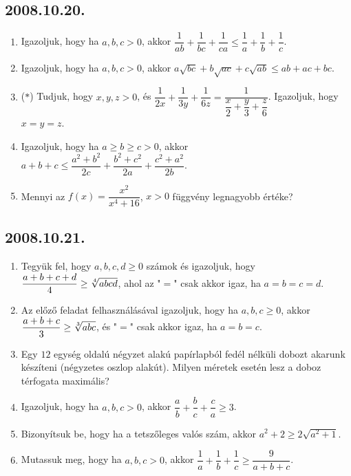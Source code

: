 \subsection*{2008.10.20.}
\begin{enumerate}
\item Igazoljuk, hogy ha $a,b,c>0$, akkor $\dfrac{1}{ab}+\dfrac{1}{bc}+\dfrac{1}{ca}\leq \dfrac{1}{a}+\dfrac{1}{b}+\dfrac{1}{c}$.
\item Igazoljuk, hogy ha $a,b,c>0$, akkor $a\sqrt{bc}+b\sqrt{ac}+c\sqrt{ab}\leq ab+ac+bc$.
\item ($*$) Tudjuk, hogy $x,y,z>0$, és $\dfrac{1}{2x}+\dfrac{1}{3y}+\dfrac{1}{6z}=\dfrac{1}{\dfrac{x}{2}+\dfrac{y}{3}+\dfrac{z}{6}}$. Igazoljuk, hogy $x=y=z$.
\item Igazoljuk, hogy ha $a\geq b\geq c>0$, akkor $a+b+c\leq \dfrac{a^2+b^2}{2c}+\dfrac{b^2+c^2}{2a}+\dfrac{c^2+a^2}{2b}$.
\item Mennyi az $f(x)=\dfrac{x^2}{x^4+16}$, $x>0$ függvény legnagyobb értéke?
\end{enumerate}
\subsection*{2008.10.21.}
\begin{enumerate}
\item Tegyük fel, hogy $a,b,c,d\geq 0$ számok és igazoljuk, hogy $\dfrac{a+b+c+d}{4}\geq \root4\of{abcd}$, ahol az "$=$" csak akkor igaz, ha $a=b=c=d$.
\item Az előző feladat felhasználásával igazoljuk, hogy ha $a,b,c\geq 0$, akkor $\dfrac{a+b+c}{3}\geq \root3\of{abc}$, és "$=$" csak akkor igaz, ha $a=b=c$.
\item Egy $12$ egység oldalú négyzet alakú papírlapból fedél nélküli dobozt akarunk készíteni (négyzetes oszlop alakút). Milyen méretek esetén lesz a doboz térfogata maximális?
\item Igazoljuk, hogy ha $a,b,c>0$, akkor $\dfrac{a}{b}+\dfrac{b}{c}+\dfrac{c}{a}\geq 3$.
\item Bizonyítsuk be, hogy ha a tetszőleges valós szám, akkor $a^2+2\geq 2\sqrt{a^2+1}$.
\item Mutassuk meg, hogy ha $a,b,c>0$, akkor $\dfrac{1}{a}+\dfrac{1}{b}+\dfrac{1}{c}\geq\dfrac{9}{a+b+c}$.
\end{enumerate}
